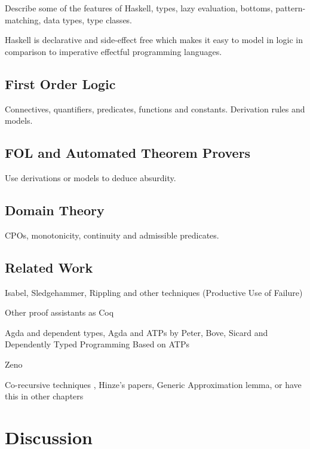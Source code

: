 \documentclass{report}
\begin{document}
Describe some of the features of Haskell, types, lazy evaluation,
bottoms, pattern-matching, data types, type classes.

Haskell is declarative and side-effect free which makes it easy
to model in logic in comparison to imperative effectful programming languages.

\section{First Order Logic}

Connectives, quantifiers, predicates, functions and constants.
Derivation rules and models.

\section{FOL and Automated Theorem Provers}

Use derivations or models to deduce absurdity.

\section{Domain Theory}

CPOs, monotonicity, continuity and admissible predicates.

\section{Related Work}

Isabel, Sledgehammer, Rippling and other techniques
(Productive Use of Failure)

Other proof assistants as Coq

Agda and dependent types, Agda and ATPs by Peter, Bove, Sicard
\cite{agdaatp} and Dependently Typed Programming Based on ATPs

Zeno

Co-recursive techniques \cite{corecursive}, Hinze's papers, Generic
Approximation lemma, or have this in other chapters







\chapter{Discussion}
\end{document}
